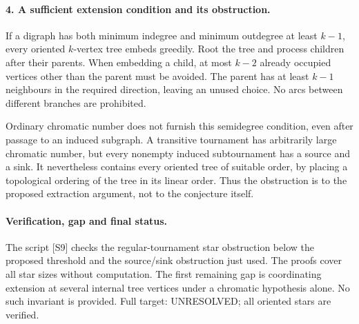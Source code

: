 \documentclass[11pt,a4paper]{article}
\begin{document}
\paragraph{4. A sufficient extension condition and its obstruction.}
If a digraph has both minimum indegree and minimum outdegree at least
$k-1$, every oriented $k$-vertex tree embeds greedily. Root the tree
and process children after their parents. When embedding a child,
at most $k-2$ already occupied vertices other than the parent must
be avoided. The parent has at least $k-1$ neighbours in the required
direction, leaving an unused choice. No arcs between different
branches are prohibited.

Ordinary chromatic number does not furnish this semidegree condition,
even after passage to an induced subgraph. A transitive tournament
has arbitrarily large chromatic number, but every nonempty induced
subtournament has a source and a sink. It nevertheless contains every
oriented tree of suitable order, by placing a topological ordering
of the tree in its linear order. Thus the obstruction is to the
proposed extraction argument, not to the conjecture itself.

\paragraph{Verification, gap and final status.}
The script [S9] checks the regular-tournament star obstruction
below the proposed threshold and the source/sink obstruction just
used. The proofs cover all star sizes without computation. The first
remaining gap is coordinating extension at several internal tree
vertices under a chromatic hypothesis alone. No such invariant is
provided. Full target: UNRESOLVED; all oriented stars are verified.
\end{document}
